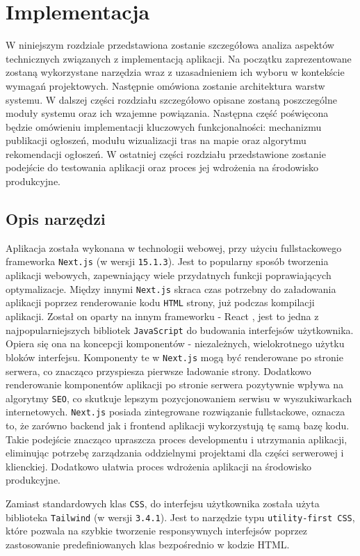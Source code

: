 \chapter{Implementacja}
W niniejszym rozdziale przedstawiona zostanie szczegółowa analiza aspektów technicznych związanych z implementacją aplikacji. Na początku zaprezentowane zostaną wykorzystane narzędzia wraz z uzasadnieniem ich wyboru w kontekście wymagań projektowych. Następnie omówiona zostanie architektura warstw systemu. W dalszej części rozdziału szczegółowo opisane zostaną poszczególne moduły systemu oraz ich wzajemne powiązania. Następna część poświęcona będzie omówieniu implementacji kluczowych funkcjonalności: mechanizmu publikacji ogłoszeń, modułu wizualizacji tras na mapie oraz algorytmu rekomendacji ogłoszeń. W ostatniej części rozdziału przedstawione zostanie podejście do testowania aplikacji oraz proces jej wdrożenia na środowisko produkcyjne.

\section{Opis narzędzi}
Aplikacja została wykonana w technologii webowej, przy użyciu fullstackowego frameworka \texttt{Next.js} \cite{Next} (w wersji \texttt{15.1.3}). Jest to popularny sposób tworzenia aplikacji webowych, zapewniający wiele przydatnych funkcji poprawiających optymalizacje. Między innymi \texttt{Next.js} skraca czas potrzebny do załadowania aplikacji poprzez renderowanie kodu \texttt{HTML} strony, już podczas kompilacji aplikacji. Został on oparty na innym frameworku - React \cite{React}, jest to jedna z najpopularniejszych bibliotek \texttt{JavaScript} do budowania interfejsów użytkownika. Opiera się ona na koncepcji komponentów - niezależnych, wielokrotnego użytku bloków interfejsu. Komponenty te w  \texttt{Next.js} mogą być renderowane po stronie serwera, co znacząco przyspiesza pierwsze ładowanie strony. Dodatkowo renderowanie komponentów aplikacji po stronie serwera pozytywnie wpływa na algorytmy \texttt{SEO}, co skutkuje lepszym pozycjonowaniem serwisu w wyszukiwarkach internetowych. \texttt{Next.js} posiada zintegrowane rozwiązanie fullstackowe, oznacza to, że zarówno backend jak i frontend aplikacji wykorzystują tę samą bazę kodu. Takie podejście znacząco upraszcza proces developmentu i utrzymania aplikacji, eliminując potrzebę zarządzania oddzielnymi projektami dla części serwerowej i klienckiej. Dodatkowo ułatwia proces wdrożenia aplikacji na środowisko produkcyjne.

Zamiast standardowych klas \texttt{CSS}, do interfejsu użytkownika została użyta biblioteka \texttt{Tailwind} \cite{Tailwind} (w wersji \texttt{3.4.1}). Jest to narzędzie typu \texttt{utility-first CSS}, które pozwala na szybkie tworzenie responsywnych interfejsów poprzez zastosowanie predefiniowanych klas bezpośrednio w kodzie HTML.

